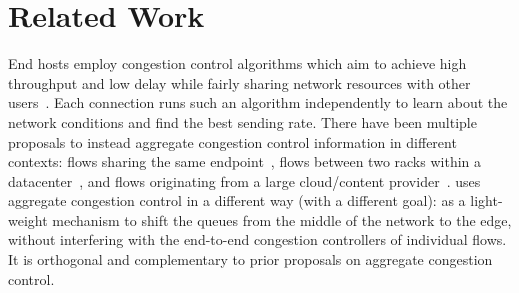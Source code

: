 \section{Related Work}
\label{s:related}


End hosts employ congestion control algorithms which aim to achieve high throughput and low delay while fairly sharing network resources with other users~\cite{Jacobson88}. 
Each connection runs such an algorithm independently to learn about the network conditions and find the best sending rate.
There have been multiple proposals to instead aggregate congestion control information in different contexts: flows sharing the same endpoint~\cite{cm}, flows between two racks within a datacenter~\cite{rackcc}, and flows originating from a large cloud/content provider~\cite{fivecomps}. 
\name uses aggregate congestion control in a different way (with a different goal): as a light-weight mechanism to shift the queues from the middle of the network to the edge, without interfering with the end-to-end congestion controllers of individual flows. It is orthogonal and complementary to prior proposals on aggregate congestion control. 

